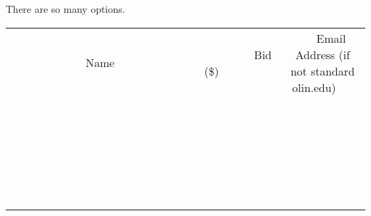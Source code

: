 \documentclass[11pt]{article}
\begin{document}
There are so many options.
\\[6ex]
\begin{tabular}{c c c}
~~~~~~~~~~~~~Name~~~~~~~~~~~~~ & ~~~~~~~~~Bid (\$)~~~~~~~~~  & ~~~Email Address (if not standard olin.edu)~~~\\
 & & \\
\hline
 & & \\
\hline
 & & \\
\hline
 & & \\
\hline
 & & \\
\hline
 & & \\
\hline
 & & \\
\hline
 & & \\
\hline
 & & \\
\hline
 & & \\
\hline
 & & \\
\hline
 & & \\
\hline
 & & \\
\hline
 & & \\
\hline
 & & \\
\hline
 & & \\
\hline
 & & \\
\hline
 & & \\
\hline
 & & \\
\hline
 & & \\
\hline
 & & \\
\hline
 & & \\
\hline
 & & \\
\hline
 & & \\
\hline
 & & \\
\hline
 & & \\
\hline
\end{tabular}
\newpage
\end{document}
